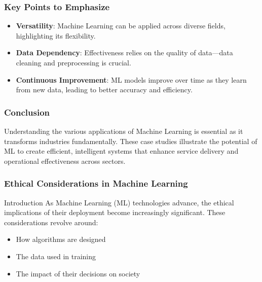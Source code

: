 \documentclass{beamer}
\begin{document}
\begin{frame}[fragile]
    \frametitle{Key Points to Emphasize}
    \begin{itemize}
        \item \textbf{Versatility}: Machine Learning can be applied across diverse fields, highlighting its flexibility.
        \item \textbf{Data Dependency}: Effectiveness relies on the quality of data—data cleaning and preprocessing is crucial.
        \item \textbf{Continuous Improvement}: ML models improve over time as they learn from new data, leading to better accuracy and efficiency.
    \end{itemize}
\end{frame}

\begin{frame}[fragile]
    \frametitle{Conclusion}
    Understanding the various applications of Machine Learning is essential as it transforms industries fundamentally. These case studies illustrate the potential of ML to create efficient, intelligent systems that enhance service delivery and operational effectiveness across sectors.
\end{frame}

\begin{frame}[fragile]
    \frametitle{Ethical Considerations in Machine Learning}
    \begin{block}{Introduction}
        As Machine Learning (ML) technologies advance, the ethical implications of their deployment become increasingly significant. These considerations revolve around:
        \begin{itemize}
            \item How algorithms are designed
            \item The data used in training
            \item The impact of their decisions on society
        \end{itemize}
    \end{block}
\end{frame}
\end{document}
